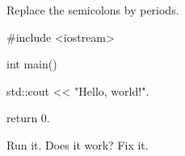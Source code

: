 Replace the semicolons by periods.
\begin{console}
#include <iostream>

int main()
{
    std::cout << "Hello, world!\n".

    return 0.
}
\end{console}
Run it. Does it work? Fix it.
